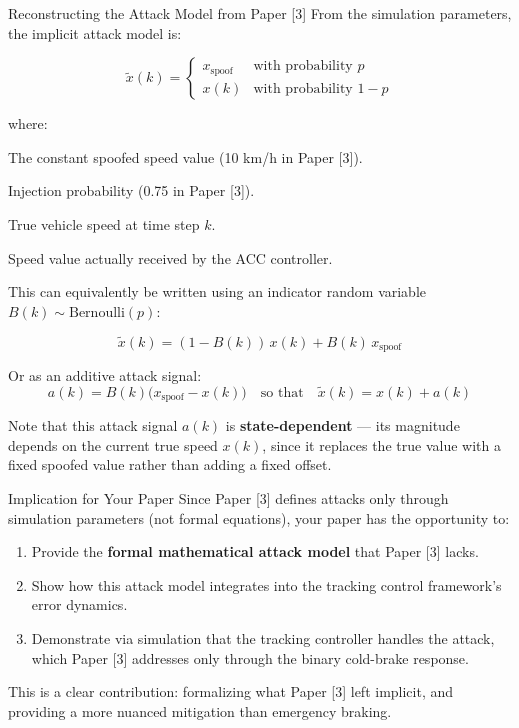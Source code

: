\begin{mathbox}{Reconstructing the Attack Model from Paper [3]}
From the simulation parameters, the implicit attack model is:

\begin{equation}
  \tilde{x}(k) =
  \begin{cases}
    x_{\text{spoof}} & \text{with probability } p \\
    x(k)             & \text{with probability } 1 - p
  \end{cases}
  \tag{Paper [3] Attack Model}
\end{equation}

where:
\begin{description}[leftmargin=3cm, style=nextline]
  \item[$x_{\text{spoof}}$] The constant spoofed speed value (10 km/h in Paper [3]).
  \item[$p$] Injection probability (0.75 in Paper [3]).
  \item[$x(k)$] True vehicle speed at time step $k$.
  \item[$\tilde{x}(k)$] Speed value actually received by the ACC controller.
\end{description}

This can equivalently be written using an indicator random variable $B(k) \sim \text{Bernoulli}(p)$:

\begin{equation}
  \tilde{x}(k) = (1 - B(k))\, x(k) + B(k)\, x_{\text{spoof}}
  \tag{Equivalent Form}
\end{equation}

Or as an additive attack signal:
\begin{equation}
  a(k) = B(k)\bigl(x_{\text{spoof}} - x(k)\bigr)
  \quad\text{so that}\quad
  \tilde{x}(k) = x(k) + a(k)
  \tag{Additive Form}
\end{equation}

Note that this attack signal $a(k)$ is \textbf{state-dependent} --- its magnitude depends on the current true speed $x(k)$, since it replaces the true value with a fixed spoofed value rather than adding a fixed offset.
\end{mathbox}

\begin{contextbox}{Implication for Your Paper}
Since Paper [3] defines attacks only through simulation parameters (not formal equations), your paper has the opportunity to:
\begin{enumerate}[label=(\alph*)]
  \item Provide the \textbf{formal mathematical attack model} that Paper [3] lacks.
  \item Show how this attack model integrates into the tracking control framework's error dynamics.
  \item Demonstrate via simulation that the tracking controller handles the attack, which Paper [3] addresses only through the binary cold-brake response.
\end{enumerate}

This is a clear contribution: formalizing what Paper [3] left implicit, and providing a more nuanced mitigation than emergency braking.
\end{contextbox}
